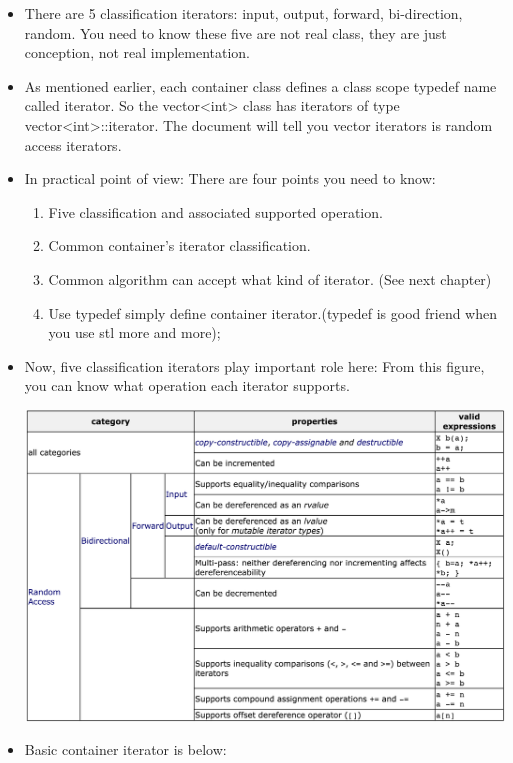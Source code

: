 \documentclass[a4paper,11pt,twoside]{book}
\begin{document}
\begin{itemize}
\item There are 5 classification iterators: input, output, forward, bi-direction, random. You need to know these five are not real class, they are just conception, not real implementation.

\item As mentioned earlier, each container class defines a class scope typedef name called iterator. So the vector<int> class has iterators of type vector<int>::iterator.  The document will tell you vector iterators is  random access iterators.

 \item In practical point of view: There are four points you need to know:
\begin{enumerate}
\item Five classification and associated supported operation.
\item Common container's iterator classification.
\item Common algorithm can accept what kind of iterator. (See next chapter)
\item Use typedef simply define container iterator.(typedef is good friend when you use stl more and more);
\end{enumerate}

\item Now, five classification iterators play important role here: From this figure, you can know what operation each iterator supports.  \newline

  \includegraphics[scale=0.48]{pics/iterator.png}

\item Basic container iterator is below: \newline


\end{itemize}
\end{document}
